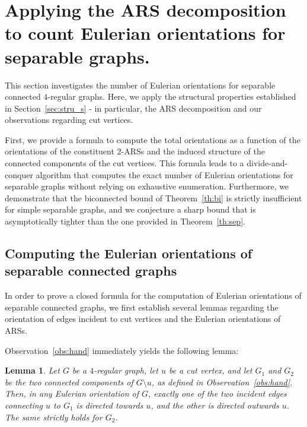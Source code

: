 \documentclass{article}
\newtheorem{lemma}{Lemma}
\begin{document}
        
    \section{Applying the ARS decomposition to count Eulerian orientations for separable graphs. }\label{sec:ARS_count}

        This section investigates the number of Eulerian orientations for separable connected $4$-regular graphs.
        Here, we apply the structural properties established in Section~\ref{sec:stru_s} - in particular, the ARS decomposition and our observations regarding cut vertices.
    
        First, we provide a formula to compute the total orientations as a function of the orientations of the constituent $2$-ARSs and the induced structure of the connected components of the cut vertices.
        This formula leads to a divide-and-conquer algorithm that computes the exact number of Eulerian orientations for separable graphs without relying on exhaustive enumeration.
        Furthermore, we demonstrate that the biconnected bound of Theorem~\ref{th:bi} is strictly insufficient for simple separable graphs, and we conjecture a sharp bound that is asymptotically tighter than the one provided in Theorem~\ref{th:sep}.

    \subsection{Computing the Eulerian orientations of separable connected graphs}


        In order to prove a closed formula for the computation of Eulerian orientations of separable connected graphs, we first establish several lemmas regarding the orientation of edges incident to cut vertices and the Eulerian orientations of ARSs.
        
        Observation~\ref{obs:hand} immediately yields the following lemma:
        
        \begin{lemma}\label{lem:cut}
            Let $G$ be a $4$-regular graph, let $u$ be a cut vertex, and let $G_1$ and $G_2$ be the two connected components of $G \setminus u$, as defined in Observation~\ref{obs:hand}.
            Then, in any Eulerian orientation of $G$, exactly one of the two incident edges connecting $u$ to $G_1$ is directed towards $u$, and the other is directed outwards $u$.
            The same strictly holds for $G_2$.
        \end{lemma}
        
\end{document}
